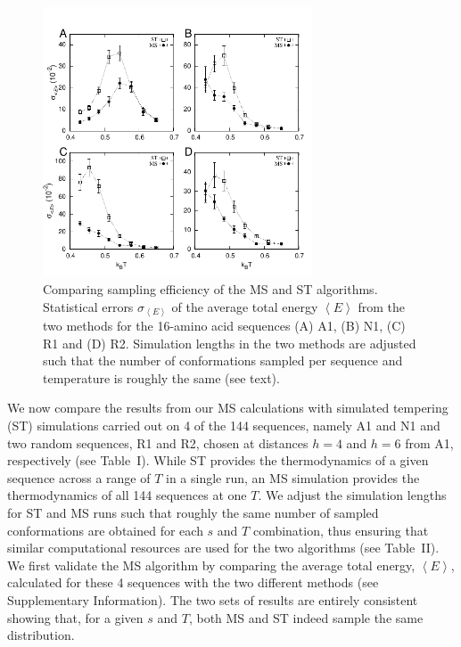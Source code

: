 \documentclass[
aip,
rsi,%
amsmath,amssymb,
reprint,%
]{revtex4-1}
\newcommand	 {\sbar}	{{s}}
\begin{document}
\begin{figure}
\includegraphics[width=8.0cm]{Stderr}
\caption{Comparing sampling efficiency of the MS and ST algorithms. Statistical errors $\sigma_{\left < E\right >}$ of the average total energy $\left < E\right >$ from the two methods for the 16-amino acid sequences (A) A1, (B) N1, (C) R1 and (D) R2. Simulation lengths in the two methods are adjusted such that the number of conformations sampled per sequence and temperature is roughly the same (see text). }
\end{figure}

We now compare the results from our MS calculations with simulated tempering (ST) simulations carried out on 4 of the 144 sequences, namely A1 and N1 and two random sequences, R1 and R2, chosen at distances $h=4$ and $h=6$ from A1, respectively (see Table~I). While ST provides the thermodynamics of a given sequence across a range of $T$ in a single run, an MS simulation provides the thermodynamics of all 144 sequences at one $T$. We adjust the simulation lengths for ST and MS runs such that roughly the same number of sampled conformations are obtained for each $\sbar$ and $T$ combination, thus ensuring that similar computational resources are used for the two algorithms (see Table~II). We first validate the MS algorithm by comparing the average total energy, $\left < E \right >$, calculated for these 4 sequences with the two different methods (see Supplementary Information). The two sets of results are entirely consistent showing that, for a given $\sbar$ and $T$, both MS and ST indeed sample the same distribution. 
\end{document}
